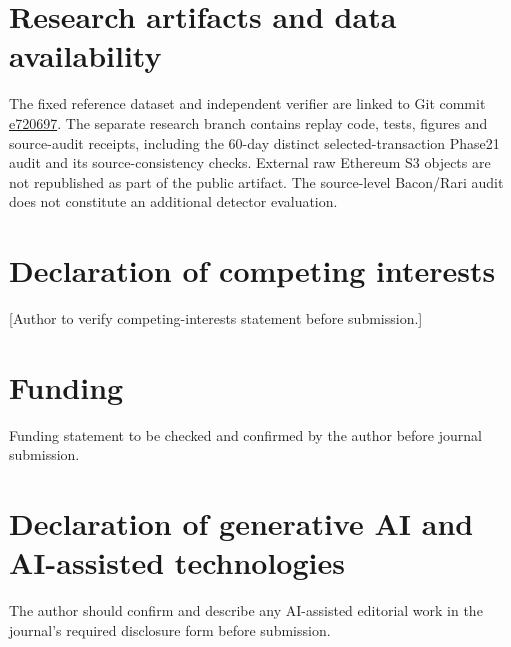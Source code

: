 \documentclass[preprint,12pt,authoryear]{elsarticle}
\begin{document}
\section*{Research artifacts and data availability}
The fixed reference dataset and independent verifier are linked to Git commit
\href{https://github.com/KuznetsovKarazin/blockchain-analytics-lab/commit/e720697bc3986dd291a7047c580cf973ae6e5567}{e720697}.
The separate research branch contains replay code, tests, figures and source-audit receipts, including the 60-day distinct selected-transaction Phase21 audit and its source-consistency checks.
External raw Ethereum S3 objects are not republished as part of the public artifact.
The source-level Bacon/Rari audit does not constitute an additional detector evaluation.
\section*{Declaration of competing interests}
[Author to verify competing-interests statement before submission.]
\section*{Funding}
Funding statement to be checked and confirmed by the author before journal submission.
\section*{Declaration of generative AI and AI-assisted technologies}
The author should confirm and describe any AI-assisted editorial work in the journal's required disclosure form before submission.


\end{document}
